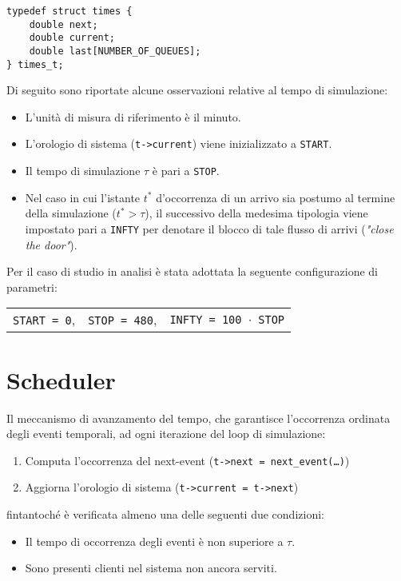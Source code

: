 \begin{lstlisting}[label={lst:modello-computazionale-1}, caption={Struttura dati per la gestione del tempo}]
typedef struct times {
    double next;                 	                                         
    double current;                	
    double last[NUMBER_OF_QUEUES];  
} times_t;
\end{lstlisting}

Di seguito sono riportate alcune osservazioni relative al tempo di simulazione:
\begin{itemize}
\item L'unità di misura di riferimento è il minuto.
\item L'orologio di sistema (\texttt{t->current}) viene inizializzato a \texttt{START}.
\item Il tempo di simulazione $\tau$ è pari a \texttt{STOP}.
\item Nel caso in cui l'istante $t^*$ d'occorrenza di un arrivo sia postumo al termine della simulazione ($t^* > \tau$), il successivo della medesima tipologia viene impostato pari a \texttt{INFTY} per denotare il blocco di tale flusso di arrivi (\textit{"close the door"}).
\end{itemize}
Per il caso di studio in analisi è stata adottata la seguente configurazione di parametri:
\begin{center}
\begin{tabular}{l c r}
\texttt{START = 0}, & \texttt{STOP = 480\footnotemark}, & \texttt{INFTY = 100 $\cdot$ STOP}
\end{tabular}
\end{center}
\section{Scheduler}\label{sec:modello-computazionale-scheduler}
Il meccanismo di avanzamento del tempo, che garantisce l'occorrenza ordinata degli eventi temporali, ad ogni iterazione del loop di simulazione:
\begin{enumerate}
\item Computa l'occorrenza del next-event (\texttt{t->next = next\_event(\dots)})
\item Aggiorna l'orologio di sistema (\texttt{t->current = t->next})
\end{enumerate}
fintantoché è verificata almeno una delle seguenti due condizioni:
\begin{itemize}
\item Il tempo di occorrenza degli eventi è non superiore a $\tau$.
\item Sono presenti clienti nel sistema non ancora serviti.
\end{itemize}


